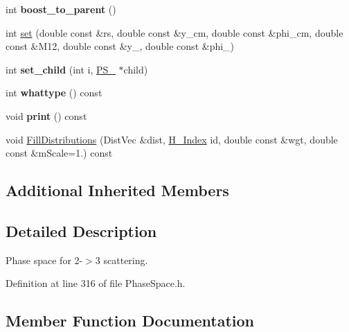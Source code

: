 \begin{DoxyCompactItemize}
\item 
\hypertarget{classPS__2__3_ad6c103ccf419ec6f416c54866d305fd0}{}int {\bfseries boost\+\_\+to\+\_\+parent} ()\label{classPS__2__3_ad6c103ccf419ec6f416c54866d305fd0}

\item 
int \hyperlink{classPS__2__3_a278af8edd62fe80330a5dc5f2d385bf5}{set} (double const \&rs, double const \&y\+\_\+cm, double const \&phi\+\_\+cm, double const \&M12, double const \&y\+\_, double const \&phi\+\_)
\item 
\hypertarget{classPS__2__3_a2da075a0d45b58fd9b4b50f6185a7368}{}int {\bfseries set\+\_\+child} (int i, \hyperlink{classPS__2}{P\+S\+\_} $\ast$child)\label{classPS__2__3_a2da075a0d45b58fd9b4b50f6185a7368}

\item 
\hypertarget{classPS__2__3_ab7105d8734ec97b22c0104bd451d619b}{}int {\bfseries whattype} () const \label{classPS__2__3_ab7105d8734ec97b22c0104bd451d619b}

\item 
\hypertarget{classPS__2__3_a98b7559fbc72002c2dd6dadb1db9be0b}{}void {\bfseries print} () const \label{classPS__2__3_a98b7559fbc72002c2dd6dadb1db9be0b}

\item 
void \hyperlink{classPS__2__3_a9beba1918553b1878e6654c70edf9387}{Fill\+Distributions} (Dist\+Vec \&dist, \hyperlink{HistArray_8h_abdf25c9f0ab78c4243f63cb2bacf26d9}{H\+\_\+\+Index} id, double const \&wgt, double const \&m\+Scale=1.) const 
\end{DoxyCompactItemize}
\subsection*{Additional Inherited Members}


\subsection{Detailed Description}
Phase space for 2-\/$>$3 scattering. 

Definition at line 316 of file Phase\+Space.\+h.



\subsection{Member Function Documentation}
\hypertarget{classPS__2__3_a9beba1918553b1878e6654c70edf9387}{}
